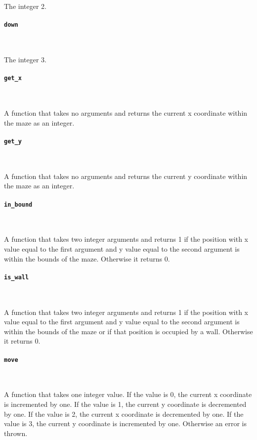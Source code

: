The integer 2.

\paragraph{\texttt{down}} \

The integer 3.

\paragraph{\texttt{get\_x}} \

A function that takes no arguments and returns the current x coordinate within the maze as an integer.

\paragraph{\texttt{get\_y}} \

A function that takes no arguments and returns the current y coordinate within the maze as an integer.

\paragraph{\texttt{in\_bound}} \

A function that takes two integer arguments and returns 1 if the position with x value equal to the first argument and y value equal to the second argument is within the bounds of the maze. Otherwise it returns 0.

\paragraph{\texttt{is\_wall}} \

A function that takes two integer arguments and returns 1 if the position with x value equal to the first argument and y value equal to the second argument is within the bounds of the maze or if that position is occupied by a wall. Otherwise it returns 0.

\paragraph{\texttt{move}} \

A function that takes one integer value. If the value is 0, the current x coordinate is incremented by one. If the value is 1, the current y coordinate is decremented by one. If the value is 2, the current x coordinate is decremented by one. If the value is 3, the current y coordinate is incremented by one. Otherwise an error is thrown.
